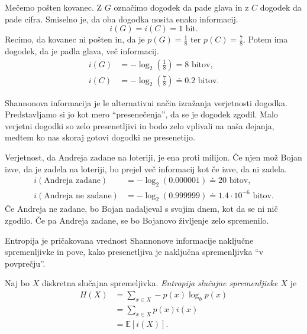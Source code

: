 \documentclass[fin1, tisk]{fmfdelo}
\newcommand{\E}{\mathbb{E}}
\theoremstyle{definition}
\begin{document}
\begin{primer}
    Mečemo pošten kovanec. Z $G$ označimo dogodek da pade glava in z $C$ dogodek da pade cifra.
    Smiselno je, da oba dogodka nosita enako informacij.
    \[
        i(G) = i(C) = 1 \text{ bit}.
    \]
    Recimo, da kovanec ni pošten in, da je $p(G) = \frac{1}{8}$ ter $p(C) = \frac{7}{8}$.
    Potem ima dogodek, da je padla glava, več informacij.
    \begin{align*}
        i(G) &= - \log_2 \left( \frac{1}{8} \right) = 8 \text{ bitov}, \\
        i(C) &= - \log_2 \left( \frac{7}{8} \right) \doteq 0.2 \text{ bitov}.
    \end{align*}
\end{primer} 

Shannonova informacija je le alternativni način izražanja verjetnosti dogodka. Predstavljamo si 
jo kot mero ``presenečenja'', da se je dogodek zgodil. Malo verjetni dogodki so zelo presenetljivi
in bodo zelo vplivali na naša dejanja, medtem ko nas skoraj gotovi dogodki ne presenetijo.

\begin{primer}
    Verjetnost, da Andreja zadane na loteriji, je ena proti milijon. Če njen mož Bojan izve, da je
    zadela na loteriji, bo prejel več informacij kot če izve, da ni zadela.
    \begin{align*}
        i(\text{Andreja zadane}) &= - \log_2 (0.000001) \doteq 20 \text{ bitov}, \\
        i(\text{Andreja ne zadane}) &= - \log_2 (0.999999) \doteq 1.4 \cdot 10^{-6} \text{ bitov}.
    \end{align*}
    Če Andreja ne zadane, bo Bojan nadaljeval s svojim dnem, kot da se ni nič zgodilo. Če pa 
    Andreja zadane, se bo Bojanovo življenje zelo spremenilo.
\end{primer}

Entropija je pričakovana vrednost Shannonove informacije naključne spremenljivke in pove,
kako presenetljiva je naključna spremenljivka ``v povprečju''.

\begin{definicija}
    Naj bo $X$ diskretna slučajna spremeljivka. \emph{Entropija slučajne spremenljivke $X$} je
    \begin{align*}
        H(X) &= \sum_{x \in X} - p(x) \log_b p(x) \\
             &= \sum_{x \in X} p(x) i(x) \\
             &= \E[i(X)].
    \end{align*}
\end{definicija}
\end{document}
